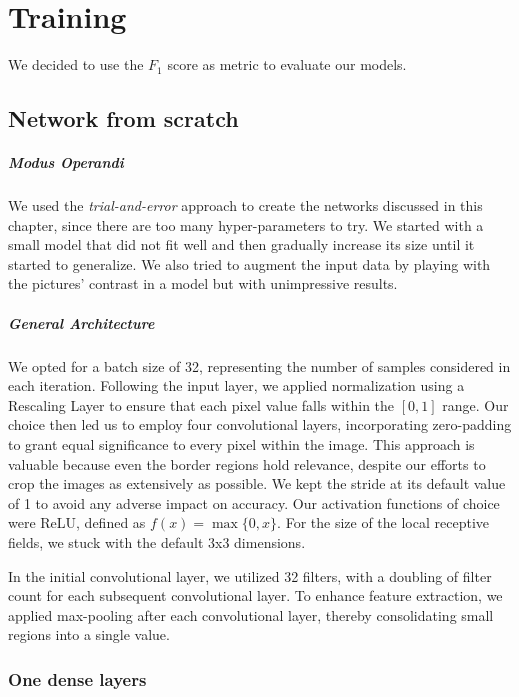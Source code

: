 \chapter{Training}

We decided to use the $F_1$ score as metric to evaluate our models.

\section{Network from scratch}

\paragraph{Modus Operandi}
We used the \emph{trial-and-error} approach to create the networks discussed in this chapter, since there are too many hyper-parameters to try.  We started with a small model that did not fit well and then gradually increase
its size until it started to generalize. We also tried to augment the input data by playing with the pictures' contrast in a model but with unimpressive results.

\paragraph{General Architecture}
We opted for a batch size of 32, representing the number of samples considered in each iteration. Following the input layer, we applied normalization using a Rescaling Layer to ensure that each pixel value falls within the $[0,1]$ range. Our choice then led us to employ four convolutional layers, incorporating zero-padding to grant equal significance to every pixel within the image. This approach is valuable because even the border regions hold relevance, despite our efforts to crop the images as extensively as possible. We kept the stride at its default value of 1 to avoid any adverse impact on accuracy. Our activation functions of choice were ReLU, defined as $f(x) = \max\{0, x\}$. For the size of the local receptive fields, we stuck with the default 3x3 dimensions.

In the initial convolutional layer, we utilized 32 filters, with a doubling of filter count for each subsequent convolutional layer. To enhance feature extraction, we applied max-pooling after each convolutional layer, thereby consolidating small regions into a single value.

\subsection{One dense layers}


